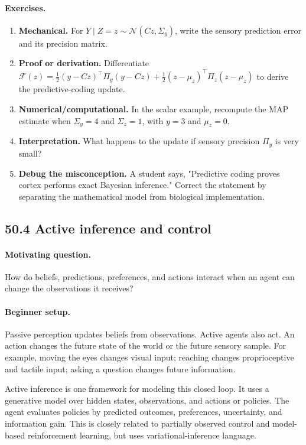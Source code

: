 \paragraph{Exercises.}
\begin{enumerate}[label=\textbf{50.3.\arabic*.}, leftmargin=*]
\item \textbf{Mechanical.} For \(Y\mid Z=z\sim\mathcal N(Cz,\Sigma_y)\), write the sensory prediction error and its precision matrix.
\item \textbf{Proof or derivation.} Differentiate \(\mathcal F(z)=\frac12(y-Cz)^\top\Pi_y(y-Cz)+\frac12(z-\mu_z)^\top\Pi_z(z-\mu_z)\) to derive the predictive-coding update.
\item \textbf{Numerical/computational.} In the scalar example, recompute the MAP estimate when \(\Sigma_y=4\) and \(\Sigma_z=1\), with \(y=3\) and \(\mu_z=0\).
\item \textbf{Interpretation.} What happens to the update if sensory precision \(\Pi_y\) is very small?
\item \textbf{Debug the misconception.} A student says, "Predictive coding proves cortex performs exact Bayesian inference." Correct the statement by separating the mathematical model from biological implementation.
\end{enumerate}

\subsection{50.4 Active inference and control}

\paragraph{Motivating question.}
How do beliefs, predictions, preferences, and actions interact when an agent can change the observations it receives?

\paragraph{Beginner setup.}
Passive perception updates beliefs from observations. Active agents also act. An action changes the future state of the world or the future sensory sample. For example, moving the eyes changes visual input; reaching changes proprioceptive and tactile input; asking a question changes future information.

Active inference is one framework for modeling this closed loop. It uses a generative model over hidden states, observations, and actions or policies. The agent evaluates policies by predicted outcomes, preferences, uncertainty, and information gain. This is closely related to partially observed control and model-based reinforcement learning, but uses variational-inference language.

